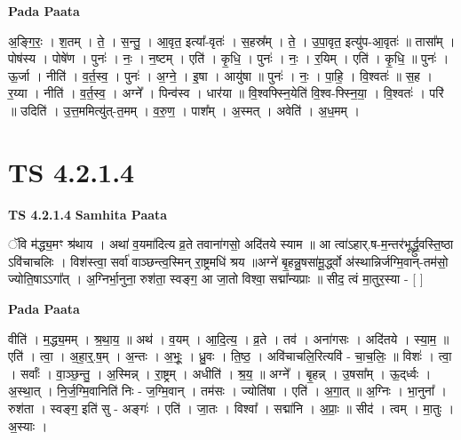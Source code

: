 \documentclass[17pt]{extarticle}
\begin{document}
\textbf{Pada Paata} \newline

अ॒ङ्गि॒रः॒ । श॒तम् । ते॒ । स॒न्तु॒ । आ॒वृत॒ इत्या᳚-वृतः॑ । स॒हस्र᳚म् । ते॒ । उ॒पा॒वृत॒ इत्यु॑प-आ॒वृतः॑ ॥ तासा᳚म् । पोष॑स्य । पोषे॑ण । पुनः॑ । नः॒ । न॒ष्टम् । एति॑ । कृ॒धि॒ । पुनः॑ । नः॒ । र॒यिम् । एति॑ । कृ॒धि॒ ॥ पुनः॑ । ऊ॒र्जा । नीति॑ । व॒र्त॒स्व॒ । पुनः॑ । अ॒ग्ने॒ । इ॒षा । आयु॑षा ॥ पुनः॑ । नः॒ । पा॒हि॒ । वि॒श्वतः॑ ॥ स॒ह । र॒य्या । नीति॑ । व॒र्त॒स्व॒ । अग्ने᳚ । पिन्व॑स्व । धार॑या ॥ वि॒श्वफ्स्नि॒येति॑ वि॒श्व-फ्स्नि॒या॒ । वि॒श्वतः॑ । परि॑ ॥ उदिति॑ । उ॒त्त॒ममित्यु॑त्-त॒मम् । व॒रु॒ण॒ । पाश᳚म् । अ॒स्मत् । अवेति॑ । अ॒ध॒मम् ।  \newline





\section{ TS 4.2.1.4 }

\textbf{TS 4.2.1.4 } \newline
\textbf{Samhita Paata} \newline

ॅवि म॑द्ध्य॒मꣳ श्र॑थाय । अथा॑ व॒यमा॑दित्य व्र॒ते तवाना॑गसो॒ अदि॑तये स्याम ॥ आ त्वा॑ऽहार्.ष-म॒न्तर॑भूर्द्ध्रु॒वस्ति॒ष्ठा ऽवि॑चाचलिः । विश॑स्त्वा॒ सर्वा॑ वाञ्छन्त्व॒स्मिन् रा॒ष्ट्रमधि॑ श्रय ॥अग्ने॑ बृ॒हन्नु॒षसा॑मू॒र्द्ध्वो अ॑स्थान्निर्जग्मि॒वान्-तम॑सो॒ ज्योति॒षाऽऽगा᳚त् । अ॒ग्निर्भा॒नुना॒ रुश॑ता॒ स्वङ्ग॒ आ जा॒तो विश्वा॒ सद्मा᳚न्यप्राः ॥ सीद॒ त्वं मा॒तुर॒स्या - [  ] \newline

\textbf{Pada Paata} \newline

वीति॑ । म॒द्ध्य॒मम् । श्र॒था॒य॒ ॥ अथ॑ । व॒यम् । आ॒दि॒त्य॒ । व्र॒ते । तव॑ । अना॑गसः । अदि॑तये । स्या॒म॒ ॥ एति॑ । त्वा॒ । अ॒हा॒र्॒.ष॒म् । अ॒न्तः । अ॒भूः॒ । ध्रु॒वः । ति॒ष्ठ॒ । अवि॑चाचलि॒रित्यवि॑ - चा॒च॒लिः॒ ॥ विशः॑ । त्वा॒ । सर्वाः᳚ । वा॒ञ्छ॒न्तु॒ । अ॒स्मिन्न् । रा॒ष्ट्रम् । अधीति॑ । श्र॒य॒ ॥ अग्ने᳚ । बृ॒हन्न् । उ॒षसा᳚म् । ऊ॒द्‌र्ध्वः । अ॒स्था॒त् । नि॒र्ज॒ग्मि॒वानिति॑ निः - ज॒ग्मि॒वान् । तम॑सः । ज्योति॑षा । एति॑ । अ॒गा॒त् ॥ अ॒ग्निः । भा॒नुना᳚ । रुश॑ता । स्वङ्ग॒ इति॑ सु - अङ्गः॑ । एति॑ । जा॒तः । विश्वा᳚ । सद्मा॑नि । अ॒प्राः॒ ॥ सीद॑ । त्वम् । मा॒तुः । अ॒स्याः ।  \newline




\end{document}
